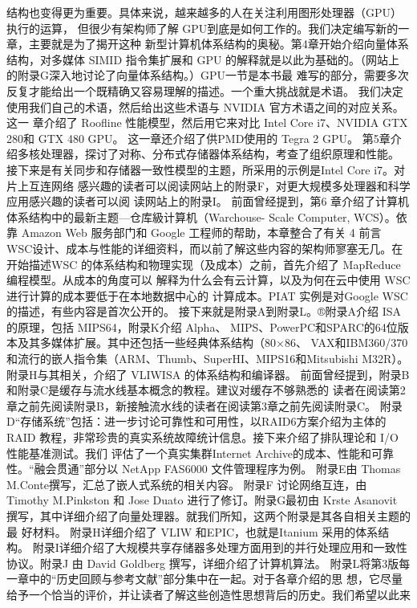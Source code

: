 结构也变得更为重要。具体来说，越来越多的人在关注利用图形处理器（GPU）执行的运算，
但很少有架构师了解 GPU到底是如何工作的。我们决定编写新的一章，主要就是为了揭开这种
新型计算机体系结构的奥秘。第4章开始介绍向量体系结构，对多媒体 SIMID 指令集扩展和 GPU
的解释就是以此为基础的。（网站上的附录G深入地讨论了向量体系结构。）GPU一节是本书最
难写的部分，需要多次反复才能给出一个既精确又容易理解的描述。一个重大挑战就是术语。
我们决定使用我们自己的术语，然后给出这些术语与 NVIDIA 官方术语之间的对应关系。这一
章介绍了 Roofline 性能模型，然后用它来对比 Intel Core i7、NVIDIA GTX 280和 GTX 480 GPU。
这一章还介绍了供PMD使用的 Tegra 2 GPU。
第5章介绍多核处理器，探讨了对称、分布式存储器体系结构，考查了组织原理和性能。
接下来是有关同步和存储器一致性模型的主题，所采用的示例是Intel Core i7。对片上互连网络
感兴趣的读者可以阅读网站上的附录F，对更大规模多处理器和科学应用感兴趣的读者可以阅
读网站上的附录I。
前面曾经提到，第6 章介绍了计算机体系结构中的最新主题—仓库級计算机（Warchouse-
Scale Computer, WCS）。依靠 Amazon Web 服务部门和 Google 工程师的帮助，本章整合了有关
4
前言
WSC设计、成本与性能的详细资料，而以前了解这些内容的架构师寥塞无几。在开始描述WSC
的体系结构和物理实现（及成本）之前，首先介绍了 MapReduce编程模型。从成本的角度可以
解释为什么会有云计算，以及为何在云中使用 WSC进行计算的成本要低于在本地数据中心的
计算成本。PIAT 实例是对Google WSC的描述，有些内容是首次公开的。
接下来就是附录A到附录L。®附录A介绍 ISA 的原理，包括 MIPS64，附录K介绍 Alpha、
MIPS、PowerPC和SPARC的64位版本及其多媒体扩展。其中还包括一些经典体系结构（80×86、
VAX和IBM360/370和流行的嵌人指令集（ARM、Thumb、SuperHI、MIPS16和Mitsubishi M32R）。
附录H与其相关，介绍了 VLIWISA 的体系结构和编译器。
前面曾经提到，附录B和附录C是缓存与流水线基本概念的教程。建议对缓存不够熟悉的
读者在阅读第2章之前先阅读附录B，新接触流水线的读者在阅读第3章之前先阅读附录C。
附录 D“存储系统”包括：进一步讨论可靠性和可用性，以RAID6方案介绍为主体的RAID
教程，非常珍贵的真实系统故障统计信息。接下来介绍了排队理论和 I/O 性能基准测试。我们
评估了一个真实集群Internet Archive的成本、性能和可靠性。“融会贯通”部分以 NetApp FAS6000
文件管理程序为例。
附录E由 Thomas M.Conte撰写，汇总了嵌人式系统的相关内容。
附录F 讨论网络互连，由 Timothy M.Pinkston 和 Jose Duato 进行了修订。附录G最初由 Krste
Asanovit 撰写，其中详细介绍了向量处理器。就我们所知，这两个附录是其各自相关主题的最
好材料。
附录H详细介绍了 VLIW 和EPIC，也就是Itanium 采用的体系结构。
附录I详细介绍了大规模共享存储器多处理方面用到的并行处理应用和一致性协议。附录J
由 David Goldberg 撰写，详细介绍了计算机算法。
附录L将第3版每一章中的“历史回顾与参考文献”部分集中在一起。对于各章介绍的思
想，它尽量给予一个恰当的评价，并让读者了解这些创造性思想背后的历史。我们希望以此来
